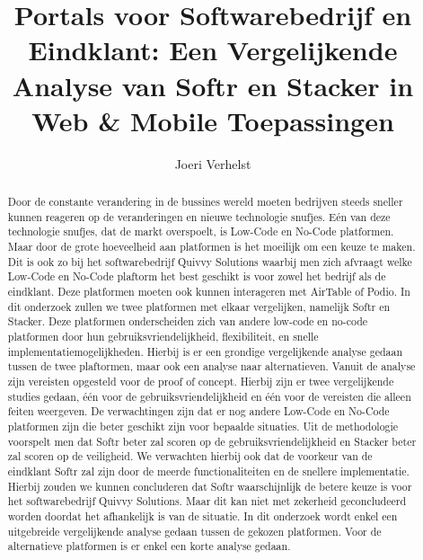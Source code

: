 \documentclass{hogent-article}
\title{Portals voor Softwarebedrijf en Eindklant: Een Vergelijkende Analyse van Softr en Stacker in Web \& Mobile Toepassingen}
\author{Joeri Verhelst}
\begin{document}
\begin{abstract}
  Door de constante verandering in de bussines wereld moeten bedrijven steeds sneller kunnen reageren op de veranderingen en nieuwe technologie snufjes. Eén van deze technologie snufjes, dat de markt overspoelt, is
  Low-Code en No-Code platformen. Maar door de grote hoeveelheid aan platformen is het moeilijk om een keuze te maken. Dit is ook zo bij het softwarebedrijf Quivvy Solutions waarbij men zich afvraagt welke Low-Code en No-Code plaftorm
  het best geschikt is voor zowel het bedrijf als de eindklant. Deze platformen moeten ook kunnen interageren met AirTable of Podio. In dit onderzoek zullen we twee platformen met elkaar vergelijken, namelijk Softr en Stacker. 
  Deze platformen onderscheiden zich van andere low-code en no-code platformen door hun gebruiksvriendelijkheid, flexibiliteit, en snelle implementatiemogelijkheden.
  Hierbij is er een grondige vergelijkende analyse gedaan tussen de twee plaftormen, maar ook een analyse naar alternatieven. Vanuit de analyse zijn vereisten opgesteld voor de proof of concept.
  Hierbij zijn er twee vergelijkende studies gedaan, één voor de gebruiksvriendelijkheid en één voor de vereisten die alleen feiten weergeven. De verwachtingen zijn dat
  er nog andere Low-Code en No-Code platformen zijn die beter geschikt zijn voor bepaalde situaties. Uit de methodologie voorspelt men dat 
  Softr beter zal scoren op de gebruiksvriendelijkheid en Stacker beter zal scoren op de veiligheid. We verwachten hierbij ook dat de voorkeur van de eindklant Softr zal zijn 
  door de meerde functionaliteiten en de snellere implementatie. Hierbij zouden we kunnen concluderen dat Softr waarschijnlijk de betere keuze is voor het softwarebedrijf Quivvy Solutions. 
  Maar dit kan niet met zekerheid geconcludeerd worden doordat het afhankelijk is van de situatie. In dit onderzoek wordt enkel een uitgebreide vergelijkende analyse gedaan tussen de gekozen platformen. 
  Voor de alternatieve platformen is er enkel een korte analyse gedaan.
\end{abstract}

\tableofcontents



\printbibliography[heading=bibintoc]
\end{document}
